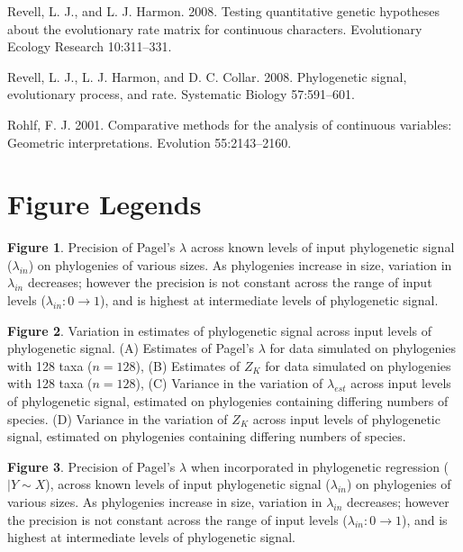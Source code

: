 \documentclass[
]{article}
\begin{document}
\leavevmode\hypertarget{ref-RevellHarmon2008}{}%
Revell, L. J., and L. J. Harmon. 2008. Testing quantitative genetic
hypotheses about the evolutionary rate matrix for continuous characters.
Evolutionary Ecology Research 10:311--331.

\leavevmode\hypertarget{ref-Revell_et_al2008}{}%
Revell, L. J., L. J. Harmon, and D. C. Collar. 2008. Phylogenetic
signal, evolutionary process, and rate. Systematic Biology 57:591--601.

\leavevmode\hypertarget{ref-Rohlf2001}{}%
Rohlf, F. J. 2001. Comparative methods for the analysis of continuous
variables: Geometric interpretations. Evolution 55:2143--2160.

\newpage

\hypertarget{figure-legends}{%
\section{Figure Legends}\label{figure-legends}}

\textbf{Figure 1}. Precision of Pagel's \(\lambda\) across known levels
of input phylogenetic signal (\(\lambda_{in}\)) on phylogenies of
various sizes. As phylogenies increase in size, variation in
\(\lambda_{in}\) decreases; however the precision is not constant across
the range of input levels (\(\lambda_{in}: 0 \to 1\)), and is highest at
intermediate levels of phylogenetic signal. \hfill\break

\textbf{Figure 2}. Variation in estimates of phylogenetic signal across
input levels of phylogenetic signal. (A) Estimates of Pagel's
\(\lambda\) for data simulated on phylogenies with 128 taxa (\(n=128\)),
(B) Estimates of \(Z_K\) for data simulated on phylogenies with 128 taxa
(\(n=128\)), (C) Variance in the variation of \(\lambda_{est}\) across
input levels of phylogenetic signal, estimated on phylogenies containing
differing numbers of species. (D) Variance in the variation of \(Z_K\)
across input levels of phylogenetic signal, estimated on phylogenies
containing differing numbers of species. \hfill\break

\textbf{Figure 3}. Precision of Pagel's \(\lambda\) when incorporated in
phylogenetic regression (\(|Y\sim X\)), across known levels of input
phylogenetic signal (\(\lambda_{in}\)) on phylogenies of various sizes.
As phylogenies increase in size, variation in \(\lambda_{in}\)
decreases; however the precision is not constant across the range of
input levels (\(\lambda_{in}: 0 \to 1\)), and is highest at intermediate
levels of phylogenetic signal. \hfill\break
\end{document}
